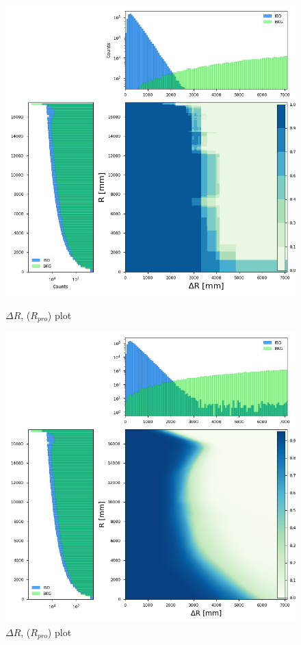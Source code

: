 \begin{figure}[h!]
	\centering
	\begin{minipage}{0.5\textwidth}
		\centering
		\includegraphics[width=0.8\linewidth]{Images/dr_r_xgboost}
		\caption{$\Delta R$, ($R_{pro}$) plot}
		\label{fig:dr_r_xgboost}
	\end{minipage}%
	\begin{minipage}{0.5\textwidth}
		\centering
		\includegraphics[width=0.8\linewidth]{Images/dr_r_pytorch}
		\caption{$\Delta R$, ($R_{pro}$) plot}
		\label{fig:dr_r_pytorch}
	\end{minipage}
\end{figure}


